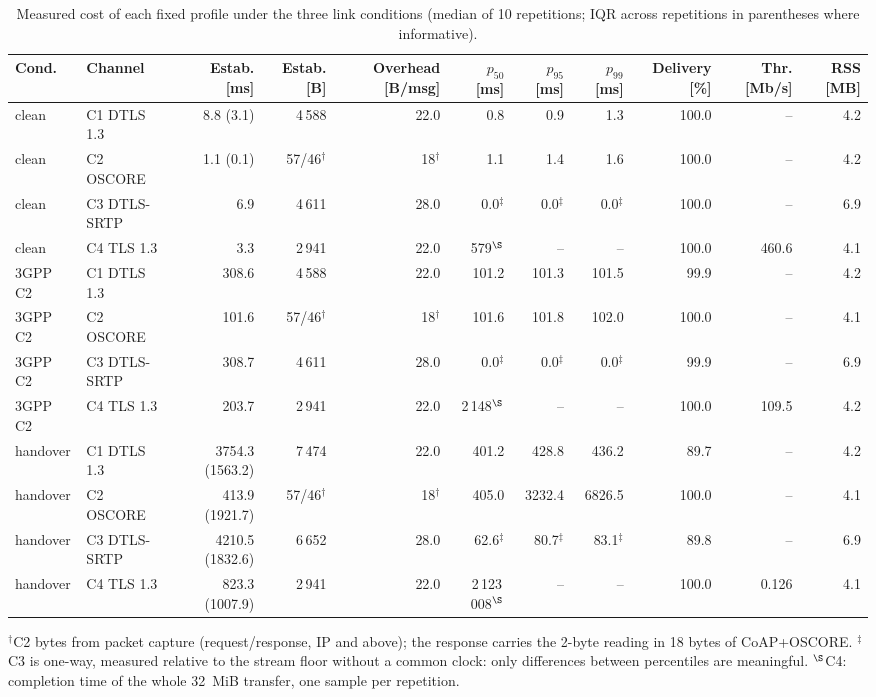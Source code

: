 \begin{table}[t]
\centering
\caption{Measured cost of each fixed profile under the three link conditions (median of 10 repetitions; IQR across repetitions in parentheses where informative).}
\label{tab:results}
\begin{tabular}{llrrrrrrrrr}
\toprule
Cond. & Channel & Estab. [ms] & Estab. [B] & Overhead [B/msg] & $p_{50}$ [ms] & $p_{95}$ [ms] & $p_{99}$ [ms] & Delivery [\%] & Thr. [Mb/s] & RSS [MB] \\
\midrule
clean & C1 DTLS 1.3 & 8.8 (3.1) & 4\,588 & 22.0 & 0.8 & 0.9 & 1.3 & 100.0 & -- & 4.2 \\
clean & C2 OSCORE & 1.1 (0.1) & 57/46$^{\dagger}$ & 18$^{\dagger}$ & 1.1 & 1.4 & 1.6 & 100.0 & -- & 4.2 \\
clean & C3 DTLS-SRTP & 6.9 & 4\,611 & 28.0 & 0.0$^{\ddagger}$ & 0.0$^{\ddagger}$ & 0.0$^{\ddagger}$ & 100.0 & -- & 6.9 \\
clean & C4 TLS 1.3 & 3.3 & 2\,941 & 22.0 & 579$^{\S}$ & -- & -- & 100.0 & 460.6 & 4.1 \\
\midrule
3GPP C2 & C1 DTLS 1.3 & 308.6 & 4\,588 & 22.0 & 101.2 & 101.3 & 101.5 & 99.9 & -- & 4.2 \\
3GPP C2 & C2 OSCORE & 101.6 & 57/46$^{\dagger}$ & 18$^{\dagger}$ & 101.6 & 101.8 & 102.0 & 100.0 & -- & 4.1 \\
3GPP C2 & C3 DTLS-SRTP & 308.7 & 4\,611 & 28.0 & 0.0$^{\ddagger}$ & 0.0$^{\ddagger}$ & 0.0$^{\ddagger}$ & 99.9 & -- & 6.9 \\
3GPP C2 & C4 TLS 1.3 & 203.7 & 2\,941 & 22.0 & 2\,148$^{\S}$ & -- & -- & 100.0 & 109.5 & 4.2 \\
\midrule
handover & C1 DTLS 1.3 & 3754.3 (1563.2) & 7\,474 & 22.0 & 401.2 & 428.8 & 436.2 & 89.7 & -- & 4.2 \\
handover & C2 OSCORE & 413.9 (1921.7) & 57/46$^{\dagger}$ & 18$^{\dagger}$ & 405.0 & 3232.4 & 6826.5 & 100.0 & -- & 4.1 \\
handover & C3 DTLS-SRTP & 4210.5 (1832.6) & 6\,652 & 28.0 & 62.6$^{\ddagger}$ & 80.7$^{\ddagger}$ & 83.1$^{\ddagger}$ & 89.8 & -- & 6.9 \\
handover & C4 TLS 1.3 & 823.3 (1007.9) & 2\,941 & 22.0 & 2\,123\,008$^{\S}$ & -- & -- & 100.0 & 0.126 & 4.1 \\
\bottomrule
\end{tabular}
\begin{flushleft}\footnotesize
$^{\dagger}$C2 bytes from packet capture (request/response, IP and above); the response carries the 2-byte reading in 18 bytes of CoAP+OSCORE. $^{\ddagger}$C3 is one-way, measured relative to the stream floor without a common clock: only differences between percentiles are meaningful. $^{\S}$C4: completion time of the whole 32~MiB transfer, one sample per repetition.
\end{flushleft}
\end{table}
